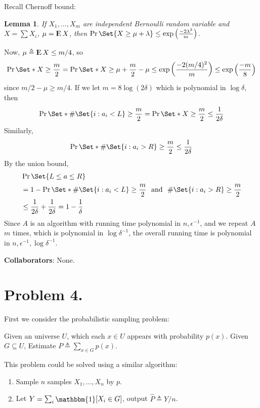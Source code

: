 \documentclass[12pt, a4paper]{article}
\newtheorem{lemma}{Lemma}
\newcommand{\defeq}{\triangleq}
\DeclareMathOperator{\Expect}{{\rm I\kern-.3em E}}
\begin{document}
Recall Chernoff bound: \smallskip
\begin{lemma}
  If $X_1, \dots, X_m$ are independent Bernoulli random variable and $X = \sum X_i$,
  $\mu = \Expect X$, then
  $\Pr\Set{X \geq \mu + \lambda} \leq \exp\left( \frac{-2\lambda^2}{m} \right)$.
\end{lemma}

Now, $\mu \defeq \Expect X \leq m/4$, so
\[ \Pr\Set*{X \geq \frac{m}{2}} = \Pr\Set*{X \geq \mu + \frac{m}{2} - \mu}
  \leq \exp\left( \frac{- 2 (m/4)^2}{m} \right) \leq \exp\left( \frac{-m}{8} \right) \]
since $m/2 - \mu \geq m/4$. If we let $m = 8 \log(2\delta)$ which is polynomial in $\log \delta$,
then
\[ \Pr\Set*{\# \Set{i: a_i < L} \geq \frac{m}{2} } =
 \Pr\Set*{X \geq \frac{m}{2}} \leq \frac{1}{2 \delta} \]
Similarly,
\[ \Pr\Set*{\# \Set{i: a_i > R} \geq \frac{m}{2} } \leq \frac{1}{2 \delta} \]
By the union bound,
\begin{align*}
  & \Pr\Set{L \leq a \leq R} \\
  & = 1 - \Pr\Set*{\# \Set{i: a_i < L} \geq \frac{m}{2}
    \ \text{ and }\  \# \Set{i: a_i > R} \geq \frac{m}{2} } \\
  & \leq \frac{1}{2 \delta} + \frac{1}{2 \delta} = 1 - \frac{1}{\delta}
\end{align*}
Since $A$ is an algorithm with running time polynomial in $n, \epsilon^{-1}$,
and we repeat $A$ $m$ times, which is polynomial in $\log \delta^{-1}$,
the overall running time is polynomial in $n, \epsilon^{-1}, \log \delta^{-1}$.

{\bf Collaborators}: None.

\section{Problem 4.}

First we consider the probabilistic sampling problem:

Given an universe $U$, which each $x \in U$ appears with probability $p(x)$.
Given $G \subseteq U$, Estimate $P \defeq \sum_{x \in G} p(x)$.

This problem could be solved using a similar algorithm:

\begin{enumerate}
  \item Sample $n$ samples $X_1, \dots, X_n$ by $p$.
  \item Let $Y = \sum_{i} \raisebox{-.05em}{$\mathlarger{\mathbbm{1}}$}[ X_i \in G ]$,
    output $\hat{P} \defeq Y/n$.
\end{enumerate}
\end{document}
